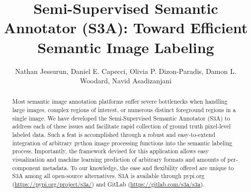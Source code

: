 \documentclass{IEEEtran}
\title{Semi-Supervised Semantic Annotator (S3A): Toward Efficient Semantic Image Labeling}
\author{Nathan Jessurun, Daniel E. Capecci, Olivia P. Dizon-Paradis, Damon L. Woodard, Navid Asadizanjani}
\begin{document}
\maketitle

\begin{abstract}
Most semantic image annotation platforms suffer severe bottlenecks when handling large images, complex regions of interest, or numerous distinct foreground regions in a single image. We have developed the Semi-Supervised Semantic Annotator (S3A) to address each of these issues and facilitate rapid collection of ground truth pixel-level labeled data. Such a feat is accomplished through a robust and easy-to-extend integration of arbitrary python image processing functions into the semantic labeling process. Importantly, the framework devised for this application allows easy visualization and machine learning prediction of arbitrary formats and amounts of per-component metadata. To our knowledge, the ease and flexibility offered are unique to S3A among all open-source alternatives. S3A is available through pypi.org (\url{https://pypi.org/project/s3a/}) and GitLab (\url{https://gitlab.com/s3a/s3a}).
\end{abstract}







\printbibliography
\end{document}
